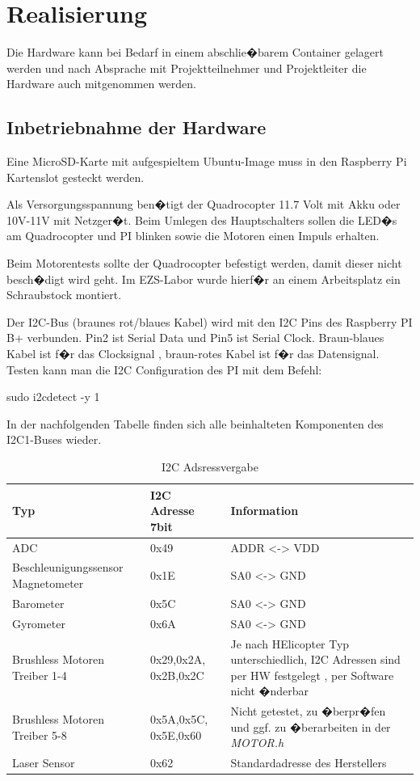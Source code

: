 \chapter{Realisierung}
\label{sec:real}

Die Hardware kann bei Bedarf in einem abschlie�barem Container gelagert werden und nach Absprache mit Projektteilnehmer und Projektleiter die Hardware auch mitgenommen werden. 

\section{Inbetriebnahme der Hardware}
\label{Inbetriebname}
Eine MicroSD-Karte mit aufgespieltem Ubuntu-Image muss in den Raspberry Pi Kartenslot gesteckt werden.

Als Versorgungsspannung ben�tigt der Quadrocopter 11.7 Volt mit Akku oder 10V-11V mit Netzger�t. Beim Umlegen des Hauptschalters sollen die LED�s am Quadrocopter und PI blinken sowie die Motoren einen Impuls erhalten.

Beim Motorentests sollte der Quadrocopter befestigt werden, damit dieser nicht besch�digt wird geht. Im EZS-Labor wurde hierf�r an einem Arbeitsplatz ein Schraubstock montiert.

Der I2C-Bus (braunes rot/blaues Kabel) wird mit den I2C Pins des Raspberry PI B+ verbunden. Pin2 ist Serial Data und Pin5 ist Serial Clock. Braun-blaues Kabel ist f�r das Clocksignal , braun-rotes Kabel ist f�r das Datensignal. Testen kann man die I2C Configuration des PI mit dem Befehl:

sudo i2cdetect -y 1

In der nachfolgenden Tabelle finden sich alle beinhalteten Komponenten des I2C1-Buses wieder.
\begin{table}[H]
	\begin{center}
		\begin{tabular}{| l | p{3cm} | |p{5cm}|}
			\hline
			Typ & I2C Adresse 7bit  & Information \\
			\hline
			ADC & 0x49 & ADDR <-> VDD\\
			\hline
			Beschleunigungssensor  \newline  Magnetometer & 0x1E  & SA0 <-> GND  \\
			\hline 
			Barometer & 0x5C & SA0 <-> GND \\
			\hline 
			Gyrometer & 0x6A & SA0 <-> GND\\
			\hline
			Brushless Motoren Treiber 1-4  &0x29,0x2A, 0x2B,0x2C& Je nach HElicopter Typ unterschiedlich, I2C Adressen sind per HW festgelegt , per Software nicht �nderbar\\
			\hline 
			Brushless Motoren Treiber 5-8  & 0x5A,0x5C, 0x5E,0x60& Nicht getestet, zu �berpr�fen und ggf. zu �berarbeiten in der \textit{MOTOR.h}\\
			\hline
			Laser Sensor & 0x62 & Standardadresse des Herstellers\\
			\hline
		\end{tabular}
	\end{center}
	\caption{I2C Adsressvergabe}
\end{table}




